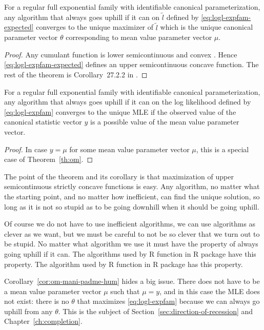 \begin{theorem} \label{th:om}
For a regular full exponential family with identifiable canonical
parameterization,
any algorithm that always goes uphill if it can on $\tilde{l}$
defined by \eqref{eq:logl-expfam-expected}
converges to the unique maximizer of $\tilde{l}$ which is the unique
canonical parameter vector $\theta$ corresponding to mean value
parameter vector $\mu$.
\end{theorem}
\begin{proof}
Any cumulant function is lower semicontinuous and convex
\citep[Theorem~7.1]{barndorff-nielsen}.
Hence \eqref{eq:logl-expfam-expected}
defines an upper semicontinuous concave function.
The rest of the theorem is Corollary~{27.2.2} in \citep{rockafellar}.
\end{proof}
\begin{corollary} \label{cor:om-mani-padme-hum}
For a regular full exponential family with identifiable canonical
parameterization,
any algorithm that always goes uphill if it can on the log likelihood
defined by \eqref{eq:logl-expfam} converges to the unique MLE if the observed
value of the canonical statistic vector $y$ is a possible value of the
mean value parameter vector.
\end{corollary}
\begin{proof}
In case $y = \mu$ for some mean value parameter vector $\mu$,
this is a special case of Theorem~\ref{th:om}.
\end{proof}

The point of the theorem and its corollary is that maximization
of upper semicontinuous strictly concave functions is easy.
Any algorithm, no matter what the starting point,
and no matter how inefficient,
can find the unique solution,
so long as it is not so stupid as to be
going downhill when it should be going uphill.

Of course we do not have to use inefficient algorithms, we can use
algorithms as clever as we want, but we must be careful to not be so
clever that we turn out to be stupid.  No matter what algorithm we
use it must have the property of always going uphill if it can.
The algorithms used by R function  in R package 
have this property.
The algorithm used by R function  in
R package 
has this property.

Corollary~\ref{cor:om-mani-padme-hum} hides a big issue.
There does not have to be a mean value parameter vector $\mu$ such that
$\mu = y$, and in this case the MLE does not exist: there is no $\theta$
that maximizes \eqref{eq:logl-expfam} because we can always go uphill
from any $\theta$.  This is the subject
of Section~\ref{sec:direction-of-recession} and Chapter~\ref{ch:completion}.

